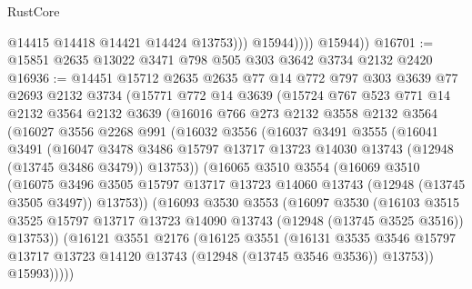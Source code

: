 \begin{lexlean}{RustCore}
\begin{coremodule}
                      @14415
                      @14418
                      @14421
                      @14424
                      @13753)))
                @15944))))
        @15944))
@16701 := @15851 @2635 @13022 @3471 @798 @505 @303 @3642 @3734 @2132 @2420
@16936 := @14451
    @15712
    @2635
    @2635
    @77
    @14
    @772
    @797
    @303
    @3639
    @77
    @2693
    @2132
    @3734
    (@15771
      @772
      @14
      @3639
      (@15724
        @767
        @523
        @771
        @14
        @2132
        @3564
        @2132
        @3639
        (@16016
          @766
          @273
          @2132
          @3558
          @2132
          @3564
          (@16027
            @3556
            @2268
            @991
            (@16032
              @3556
              (@16037
                @3491
                @3555
                (@16041
                  @3491
                  (@16047
                    @3478
                    @3486
                    @15797
                    @13717
                    @13723
                    @14030
                    @13743
                    (@12948 (@13745 @3486 @3479))
                    @13753))
                (@16065
                  @3510
                  @3554
                  (@16069
                    @3510
                    (@16075
                      @3496
                      @3505
                      @15797
                      @13717
                      @13723
                      @14060
                      @13743
                      (@12948 (@13745 @3505 @3497))
                      @13753))
                  (@16093
                    @3530
                    @3553
                    (@16097
                      @3530
                      (@16103
                        @3515
                        @3525
                        @15797
                        @13717
                        @13723
                        @14090
                        @13743
                        (@12948 (@13745 @3525 @3516))
                        @13753))
                    (@16121
                      @3551
                      @2176
                      (@16125
                        @3551
                        (@16131
                          @3535
                          @3546
                          @15797
                          @13717
                          @13723
                          @14120
                          @13743
                          (@12948 (@13745 @3546 @3536))
                          @13753))
                      @15993)))))

\end{coremodule}
\end{lexlean}
